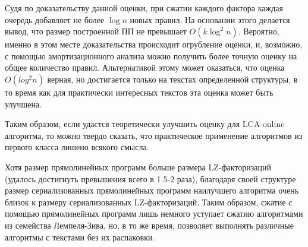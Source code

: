 \documentclass[14pt]{article}
\begin{document}
Судя по доказательству данной оценки, при сжатии каждого фактора каждая очередь добавляет не более $\log n$ новых правил.
На основании этого делается вывод, что размер построенной ПП не превышает $O(k\log^2 n)$. Вероятно, именно в этом месте доказательства
происходит огрубление оценки, и, возможно, с помощью амортизационного анализа можно получить более точную оценку на общее количество
правил. Альтернативой этому может оказаться, что оценка $O(log^2 n)$ верная, но достигается только на текстах определенной структуры,
в то время как для практически интересных текстов эта оценка может быть улучшена.

Таким образом, если удастся теоретически улучшить оценку для LCA-online алгоритма, то можно твердо сказать,
что практическое применение алгоритмов из первого класса лишено всякого смысла.

Хотя размер прямолинейных программ больше размера LZ-факторизаций (удалось достигнуть превышения всего в 1.5-2 раза),
благодаря своей структуре размер сериализованных прямолинейных программ наилучшего алгоритма очень близок к размеру
сериализованных LZ-факторизаций. Таким образом, сжатие с помощью прямолинейных программ лишь немного уступает сжатию
алгоритмами из семейства Лемпеля-Зива, но, в то же время, позволяет выполнять различные алгоритмы с текстами без их
распаковки.
\end{document}
